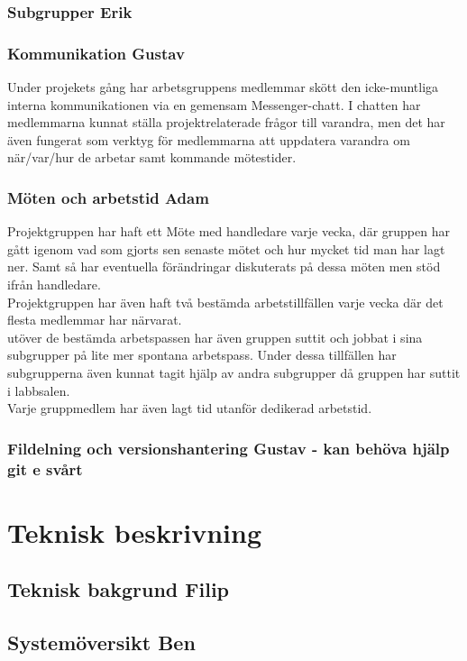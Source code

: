 \documentclass{article}
\begin{document}
\subsubsection{Subgrupper Erik}
\subsubsection{Kommunikation Gustav}
Under projekets gång har arbetsgruppens medlemmar skött den icke-muntliga interna kommunikationen via en gemensam Messenger-chatt. I chatten har medlemmarna kunnat ställa projektrelaterade frågor till varandra, men det har även fungerat som verktyg för medlemmarna att uppdatera varandra om när/var/hur de arbetar samt kommande mötestider.
\subsubsection{Möten och arbetstid Adam}
Projektgruppen har haft ett Möte med handledare varje vecka, där
gruppen har gått igenom vad som gjorts sen senaste mötet och hur
mycket tid man har lagt ner. Samt så har eventuella förändringar
diskuterats på dessa möten men stöd ifrån handledare.\\
Projektgruppen har även haft två bestämda arbetstillfällen varje
vecka där det flesta medlemmar har närvarat. \\
utöver de bestämda arbetspassen har även gruppen suttit och 
jobbat i sina subgrupper på lite mer spontana arbetspass. Under
dessa tillfällen har subgrupperna även kunnat tagit hjälp av 
andra subgrupper då gruppen har suttit i labbsalen.\\
Varje gruppmedlem har även lagt tid utanför dedikerad arbetstid.  

\subsubsection{Fildelning och versionshantering Gustav - kan behöva hjälp git e svårt}


\section{Teknisk beskrivning} %
\subsection{Teknisk bakgrund Filip}
\subsection{Systemöversikt Ben}
\end{document}
